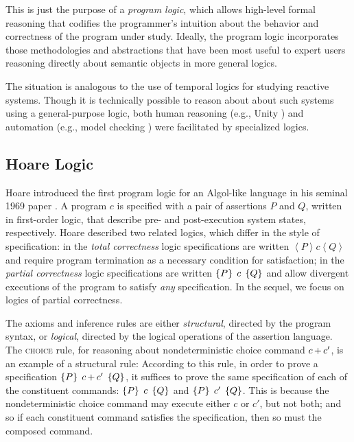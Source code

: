 \documentclass[11pt]{report}         %
\begin{document}
This is just the purpose of a \emph{program logic}, which allows high-level formal reasoning that codifies the programmer's intuition about the behavior and correctness of the program under study. Ideally, the program logic incorporates those methodologies and abstractions that have been most useful to expert users reasoning directly about semantic objects in more general logics.

The situation is analogous to the use of temporal logics for studying reactive systems. Though it is technically possible to reason about about such systems using a general-purpose logic, both human reasoning (e.g., Unity \cite{unity-book}) and automation (e.g., model checking \cite{model-checking}) were facilitated by specialized logics.

\subsection{Hoare Logic}
\label{sec:hoare-logic}

Hoare introduced the first program logic for an Algol-like language in his seminal 1969 paper \cite{DBLP:journals/cacm/Hoare69}. A program $c$ is specified with a pair of assertions $P$ and $Q$, written in first-order logic, that describe pre- and post-execution system states, respectively. Hoare described two related logics, which differ in the style of specification: in the \emph{total correctness} logic specifications are written $\left\langle P \right\rangle c \left\langle Q \right\rangle$ and require program termination as a necessary condition for satisfaction; in the \emph{partial correctness} logic specifications are written $\left\lbrace P \right\rbrace\;c\;\left\lbrace Q \right\rbrace$ and allow divergent executions of the program to satisfy \emph{any} specification. In the sequel, we focus on logics of partial correctness. 

The axioms and inference rules are either \emph{structural}, directed by the program syntax, or \emph{logical}, directed by the logical operations of the assertion language. The \textsc{choice} rule, for reasoning about nondeterministic choice command $c \operatorname{+} c'$, is an example of a structural rule:  According to this rule, in order to prove a specification $\left\lbrace P \right\rbrace\;c \operatorname{+} c'\;\left\lbrace Q \right\rbrace$, it suffices to prove the same specification of each of the constituent commands: $\left\lbrace P \right\rbrace\;c\;\left\lbrace Q \right\rbrace$ and $\left\lbrace P \right\rbrace\;c'\;\left\lbrace Q \right\rbrace$. This is because the nondeterministic choice command may execute either $c$ or $c'$, but not both; and so if each constituent command satisfies the specification, then so must the composed command. 
\end{document}
